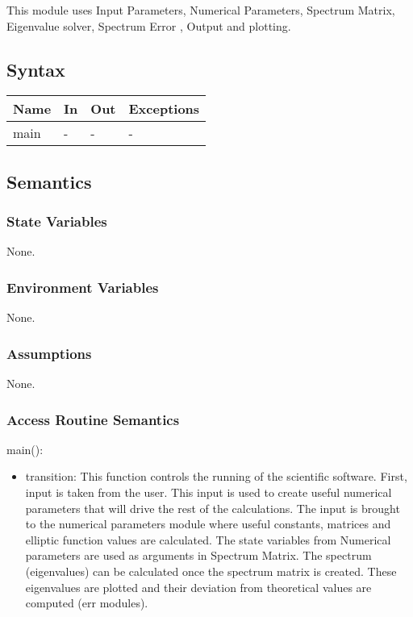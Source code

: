 \documentclass[12pt, titlepage]{article}
\begin{document}
This module uses Input Parameters, Numerical Parameters, Spectrum Matrix, 
Eigenvalue solver, Spectrum Error , Output and plotting.

\subsection{Syntax}

\begin{center}
	\begin{tabular}{p{2cm} p{6cm} p{6cm} p{3cm}}
		\hline
		\textbf{Name} & \textbf{In} & \textbf{Out} & \textbf{Exceptions} \\
		\hline
		main & - & - & - \\ 
		\hline
	\end{tabular}
\end{center}

\subsection{Semantics}

\subsubsection{State Variables}

None.

\subsubsection{Environment Variables}

None.

\subsubsection{Assumptions}

None.

\subsubsection{Access Routine Semantics}

\noindent main():
\begin{itemize}
	\item transition: This function controls the running of the scientific 
	software. First, input is taken from the user. This input is used to create 
	useful numerical parameters that will drive the rest of the calculations. 
	The input is brought to the numerical parameters module where useful 
	constants, matrices and elliptic function values are calculated. The state 
	variables from Numerical parameters are used as arguments in Spectrum 
	Matrix. The spectrum (eigenvalues) can be calculated once the spectrum 
	matrix is created. These eigenvalues are plotted and their deviation from 
	theoretical values are computed (err modules). 
\end{itemize}
\end{document}
